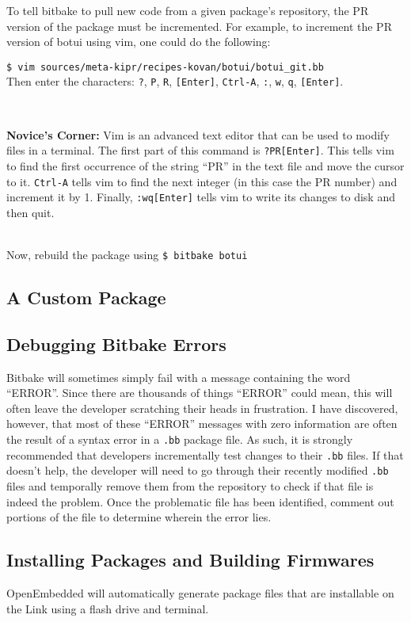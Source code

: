 \documentclass[12pt,letterpaper]{article}
\newcommand{\bcolorbox}[4]{\noindent \\ \fcolorbox{#1}{#2} {\parbox{\textwidth}{\vspace{.1em}\textbf{#3} #4\vspace{.1em}}} \\}
\newcommand{\novice}[1]{\bcolorbox{green}{Honeydew}{Novice's Corner:}{#1}}
\begin{document}
	To tell bitbake to pull new code from a given package's repository, the PR version of the package must be incremented. For example,
	to increment the PR version of botui using vim, one could do the following:
	
	\noindent \texttt{\$ vim sources/meta-kipr/recipes-kovan/botui/botui\_git.bb} \\
	\noindent Then enter the characters: \texttt{?}, \texttt{P}, \texttt{R}, \texttt{[Enter]}, \texttt{Ctrl-A}, \texttt{:}, \texttt{w}, \texttt{q}, \texttt{[Enter]}.
	
	\novice{Vim is an advanced text editor that can be used to modify files in a terminal. The first part of this command is \texttt{?PR[Enter]}.
	This tells vim to find the first occurrence of the string ``PR'' in the text file and move the cursor to it. \texttt{Ctrl-A} tells vim to
	find the next integer (in this case the PR number) and increment it by 1. Finally, \texttt{:wq[Enter]} tells vim to write its changes to disk
	and then quit.}
	
	Now, rebuild the package using \texttt{\$ bitbake botui}
	
	
	\subsection{A Custom Package}
	
	\subsection{Debugging Bitbake Errors}
	Bitbake will sometimes simply fail with a message containing the word ``ERROR''. Since there are thousands of things ``ERROR'' could
	mean, this will often leave the developer scratching their heads in frustration. I have discovered, however, that most of these ``ERROR''
	messages with zero information are often the result of a syntax error in a \texttt{.bb} package file. As such, it is strongly recommended
	that developers incrementally test changes to their \texttt{.bb} files. If that doesn't help, the developer will need to go through their
	recently modified \texttt{.bb} files and temporally remove them from the repository to check if that file is indeed the problem. Once the
	problematic file has been identified, comment out portions of the file to determine wherein the error lies.
	
	\subsection{Installing Packages and Building Firmwares}
	OpenEmbedded will automatically generate package files that are installable on the Link using a flash drive and terminal.
	
\end{document}
